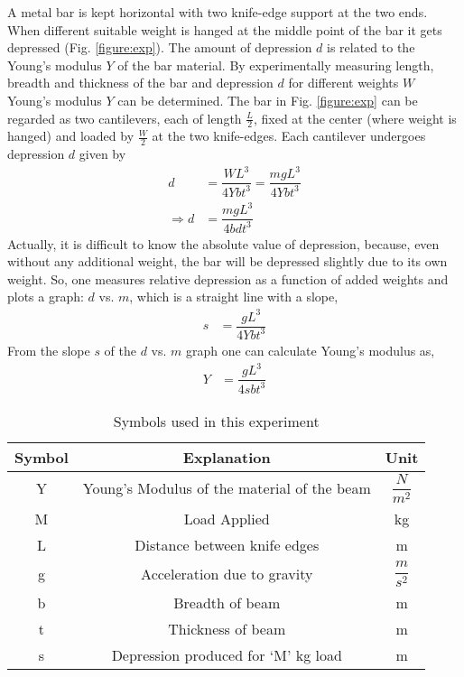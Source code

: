 \documentclass[12pt]{article}
\begin{document}
	A metal bar is kept horizontal with two knife-edge support at the two ends. When different 
	suitable weight is hanged at the middle point of the bar it gets depressed (Fig. \ref{figure:exp}). The amount of depression $d$ is related to the 
	Young’s modulus $Y$ of the bar material. By experimentally measuring
	length, breadth and thickness of the bar and depression $d$ for different 
	weights $W$ Young’s modulus $Y$ can be determined. 
	The bar in Fig. \ref{figure:exp} can be regarded as two cantilevers, each of length $\frac{L}{2}$, 
	fixed at the center (where weight is hanged) and loaded by $\frac{W}{2}$ at the 
	two knife-edges. Each cantilever undergoes depression $d$ given by
	\begin{align}
		d&= \dfrac{WL^{3}}{4Ybt^{3}} = \dfrac{mgL^{3}}{4Ybt^{3}}\\
		\Rightarrow d&= \dfrac{mgL^{3}}{4bdt^{3}}
	\end{align}
	Actually, it is difficult to know the absolute value of depression, because, even without any additional weight, the bar will be 
	depressed slightly due to its own weight. So, one measures relative depression as a function of added weights and plots a graph: 
	$d$ vs. $m$, which is a straight line with a slope,
	\begin{align}
		s&= \dfrac{gL^{3}}{4Ybt^{3}}
	\end{align} 
	From the slope $s$ of the $d$ vs. $m$ graph one can calculate Young’s 
	modulus as,
	\begin{align}
		Y&=\dfrac{gL^{3}}{4sbt^{3}}
	\end{align}

	\begin{table}[H]
		\centering
		\def\arraystretch{1.5}
		\caption{Symbols used in this experiment}
		\begin{tabular}{|c|c|c|}
			\hline
			Symbol&Explanation&Unit\\
			\hline
			\hline
			Y&Young's Modulus of the material of the beam&$\dfrac{N}{m^{2}}$\\
			\hline
			M&Load Applied&kg\\
			\hline
			L&Distance between knife edges&m\\
			\hline
			g&Acceleration due to gravity&$\dfrac{m}{s^{2}}$\\
			\hline
			b&Breadth of beam&m\\
			\hline
			t&Thickness of beam&m\\
			\hline
			s&Depression produced for `M' kg load&m\\
			\hline
			
		\end{tabular}
		\label{tab:symbols}
	\end{table}
	
\end{document}

